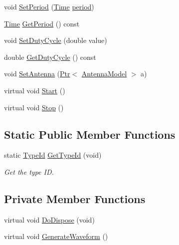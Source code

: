 \begin{DoxyCompactItemize}
\item 
void \hyperlink{classns3_1_1WaveformGenerator_af3dfd909dc0ba232cb44e88ea95f8675}{Set\+Period} (\hyperlink{classns3_1_1Time}{Time} \hyperlink{mmwave_2model_2fading-traces_2fading__trace__generator_8m_ae10c944bf9f3fba2686a5885ecc192d7}{period})
\item 
\hyperlink{classns3_1_1Time}{Time} \hyperlink{classns3_1_1WaveformGenerator_a1a866556d2c82e7778f8f059681af798}{Get\+Period} () const 
\item 
void \hyperlink{classns3_1_1WaveformGenerator_ae904df76621efd346d4bf4c825febb03}{Set\+Duty\+Cycle} (double value)
\item 
double \hyperlink{classns3_1_1WaveformGenerator_a79aa0796dbea688739d48dfabad14b35}{Get\+Duty\+Cycle} () const 
\item 
void \hyperlink{classns3_1_1WaveformGenerator_a3bad8624f53b63ed3913012d783835a6}{Set\+Antenna} (\hyperlink{classns3_1_1Ptr}{Ptr}$<$ \hyperlink{classns3_1_1AntennaModel}{Antenna\+Model} $>$ a)
\item 
virtual void \hyperlink{classns3_1_1WaveformGenerator_acae62e68efad9596b5714f291c9f23bb}{Start} ()
\item 
virtual void \hyperlink{classns3_1_1WaveformGenerator_af3f769456a90799a9fe7634bf0ba892e}{Stop} ()
\end{DoxyCompactItemize}
\subsection*{Static Public Member Functions}
\begin{DoxyCompactItemize}
\item 
static \hyperlink{classns3_1_1TypeId}{Type\+Id} \hyperlink{classns3_1_1WaveformGenerator_af0b90ec9f277ef4ea28c5a56788d6ca4}{Get\+Type\+Id} (void)
\begin{DoxyCompactList}\small\item\em Get the type ID. \end{DoxyCompactList}\end{DoxyCompactItemize}
\subsection*{Private Member Functions}
\begin{DoxyCompactItemize}
\item 
virtual void \hyperlink{classns3_1_1WaveformGenerator_ace2a5f7cb3577f078624fa7c19158678}{Do\+Dispose} (void)
\item 
virtual void \hyperlink{classns3_1_1WaveformGenerator_a79891eacee028b286ba0c0473b15454c}{Generate\+Waveform} ()
\end{DoxyCompactItemize}
